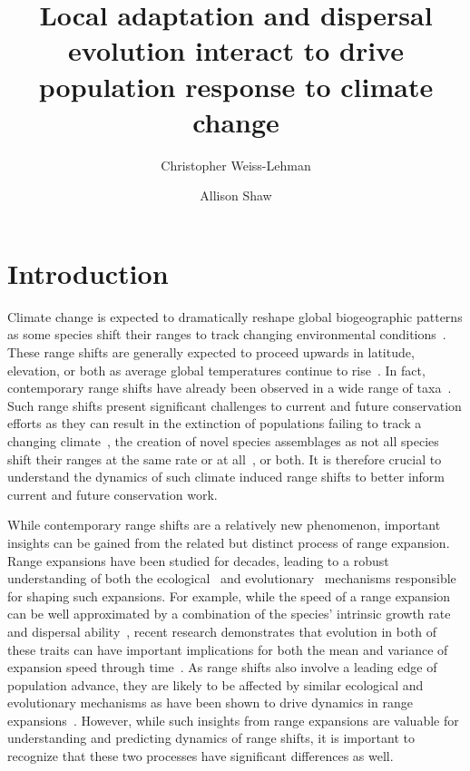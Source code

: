 \documentclass[11pt, oneside]{article}
\title{Local adaptation and dispersal evolution interact to drive population response to climate change}
\date{}
\author[1]{Christopher Weiss-Lehman}
\author[1]{Allison Shaw}
\affil[1]{Ecology, Evolution, and Behavior, University of Minnesota}
\begin{document}
\maketitle

\doublespacing
\linenumbers

\section{Introduction}
Climate change is expected to dramatically reshape global biogeographic patterns as some species shift their ranges to track changing environmental conditions~\citep{gonzalez2010global, penuelas2003global, hansen2001global, scholze2006climate}. These range shifts are generally expected to proceed upwards in latitude, elevation, or both as average global temperatures continue to rise~\citep{loarie2009velocity}. In fact, contemporary range shifts have already been observed in a wide range of taxa~\citep{chen2011rapid, walther2002ecological, parmesan2003globally, parmesan2006ecological, parmesan1999poleward, perry2005climate}. Such range shifts present significant challenges to current and future conservation efforts as they can result in the extinction of populations failing to track a changing climate~\citep{davis2001range, parmesan2006ecological, zhu2012failure, sekercioglu2008climate}, the creation of novel species assemblages as not all species shift their ranges at the same rate or at all~\citep{hobbs2009novel, gilman2010framework, williams2007novel}, or both. It is therefore crucial to understand the dynamics of such climate induced range shifts to better inform current and future conservation work.

While contemporary range shifts are a relatively new phenomenon, important insights can be gained from the related but distinct process of range expansion. Range expansions have been studied for decades, leading to a robust understanding of both the ecological~\citep{skellam1951random, hastings2005spatial} and evolutionary~\citep{shine2011evolutionary, burton2010trade, excoffier2009genetic, kubisch2014and} mechanisms responsible for shaping such expansions. For example, while the speed of a range expansion can be well approximated by a combination of the species' intrinsic growth rate and dispersal ability~\citep{hastings2005spatial}, recent research demonstrates that evolution in both of these traits can have important implications for both the mean and variance of expansion speed through time~\citep{weiss2017rapid, ochocki2017rapid, szHucs2017rapid, phillips2015evolutionary}. As range shifts also involve a leading edge of population advance, they are likely to be affected by similar ecological and evolutionary mechanisms as have been shown to drive dynamics in range expansions~\citep{hargreaves2014evolution}. However, while such insights from range expansions are valuable for understanding and predicting dynamics of range shifts, it is important to recognize that these two processes have significant differences as well.
\end{document}
